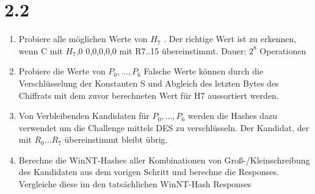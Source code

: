 \documentclass[10pt,a4paper]{article}
\begin{document}
\section*{2.2}
\begin{enumerate}
\item Probiere alle möglichen Werte von $H_{7}$ . Der richtige Wert ist zu erkennen, wenn C mit $H_{7}$,0 0,0,0,0,0 mit R7..15 übereinstimmt. Dauer: $2^{8}$ Operationen
\item Probiere die Werte von  $P_{0},\dots, P_{6}$ Falsche Werte können durch die Verschlüsselung  der Konstanten S  und Abgleich des letzten Bytes des Chiffrats mit dem zuvor berechneten Wert für  H7 aussortiert werden.
\item Von Verbleibenden Kandidaten für $P_{0},\dots, P_{6}$ werden die Hashes dazu verwendet um die Challenge mittels DES zu verschlüsseln. Der Kandidat, der mit $R_{0}...R_{7}$ übereinstimmt bleibt übrig.
\item Berechne die WinNT-Hashes aller Kombinationen von Groß-/Kleinschreibung des Kandidaten aus dem vorigen Schritt und berechne die Responses. Vergleiche diese im den tatsächlichen WinNT-Hash Responses
\end{enumerate}
\end{document}

